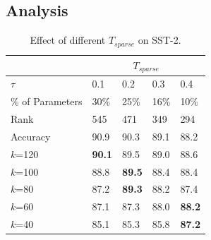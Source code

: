 \subsection{Analysis}
\label{sec:analysis}

\begin{table}[t]
	\centering
	\scriptsize
	\begin{tabular}{|l|llll|}
		\hline
		&	\multicolumn{4}{c|}{$T_{sparse}$} \\
		\hline
		\multicolumn{1}{|l|}{$\tau$}           &0.1  &0.2  &0.3           &0.4                      \\
		\multicolumn{1}{|l|}{\% of Parameters}           & 30\% & 25\% & 16\%          & 10\%                     \\
		\multicolumn{1}{|l|}{Rank}               &545   &471   &349            &294                        \\
		\multicolumn{1}{|l|}{Accuracy}           & 90.9 & 90.3 & 89.1          & 88.2                     \\
		
		\hline
		\multicolumn{1}{|l|}{$k$=120}       &\textbf{90.1}  &89.5  &89.0           &88.6                      \\
		\multicolumn{1}{|l|}{$k$=100}        &88.8  &\textbf{89.5}  &88.4           &88.4                      \\
		\multicolumn{1}{|l|}{$k$=80}                  &87.2  &\textbf{89.3}  &88.2  &87.4                      \\
		\multicolumn{1}{|l|}{$k$=60}                  &87.1  &87.3  &88.0           &\textbf{88.2}             \\
		\multicolumn{1}{|l|}{$k$=40}                  &85.1  &85.3  &85.8           &\textbf{87.2}             \\
		\hline
	\end{tabular}
	\caption{Effect of different $T_{sparse}$ on SST-2.
	}
	\label{table:diffsparse}
\end{table}

